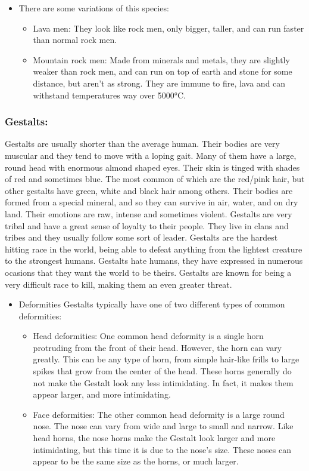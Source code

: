 \documentclass[11pt]{article}
\begin{document}
\begin{itemize}
\item There are some variations of this species:
\label{sec:org6e5be6b}
\begin{itemize}
\item Lava men: They look like rock men, only bigger, taller, and can run faster than normal rock men.
\item Mountain rock men: Made from minerals and metals, they are slightly weaker than rock men, and can run on top of earth and stone for some distance, but aren't as strong. They are immune to fire, lava and can withstand temperatures way over 5000°C.
\end{itemize}
\end{itemize}

\subsubsection*{Gestalts:}
\label{sec:org87c1605}
Gestalts are usually shorter than the average human. Their bodies are very muscular and they tend to move with a loping gait. Many of them have a large, round head with enormous almond shaped eyes. Their skin is tinged with shades of red and sometimes blue.
The most common of which are the red/pink hair, but other gestalts have green, white and black hair among others.
Their bodies are formed from a special mineral, and so they can survive in air, water, and on dry land.
Their emotions are raw, intense and sometimes violent.
Gestalts are very tribal and have a great sense of loyalty to their people. They live in clans and tribes and they usually follow some sort of leader.
Gestalts are the hardest hitting race in the world, being able to defeat anything from the lightest creature to the strongest humans.
Gestalts hate humans, they have expressed in numerous ocasions that they want the world to be theirs.
Gestalts are known for being a very difficult race to kill, making them an even greater threat.

\begin{itemize}
\item Deformities
\label{sec:org556edd1}
Gestalts typically have one of two different types of common deformities:
\begin{itemize}
\item Head deformities:
One common head deformity is a single horn protruding from the front of their head. However, the horn can vary greatly. This can be any type of horn, from simple hair-like frills to large spikes that grow from the center of the head. These horns generally do not make the Gestalt look any less intimidating. In fact, it makes them appear larger, and more intimidating.

\item Face deformities:
The other common head deformity is a large round nose. The nose can vary from wide and large to small and narrow. Like head horns, the nose horns make the Gestalt look larger and more intimidating, but this time it is due to the nose's size. These noses can appear to be the same size as the horns, or much larger.
\end{itemize}
\end{itemize}
\end{document}

